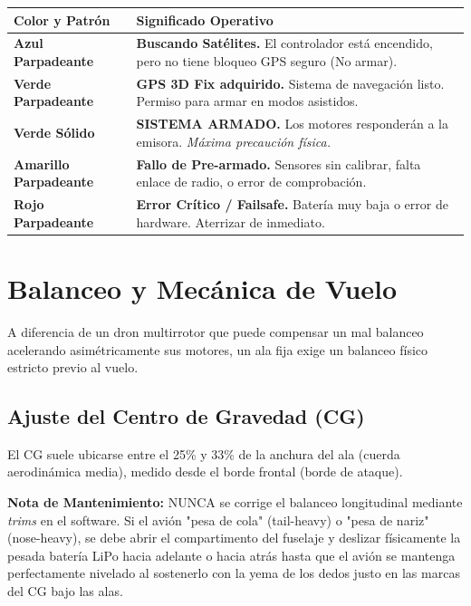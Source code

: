 \documentclass[11pt,a4paper]{article}
\begin{document}
\renewcommand{\arraystretch}{1.5}
\begin{tabularx}{\textwidth}{|>{\centering\arraybackslash}p{4cm}|>{\raggedright\arraybackslash}X|}
\hline
\rowcolor{tablehead} \textbf{Color y Patrón} & \textbf{Significado Operativo} \\ \hline
\textcolor{ledblue}{\textbf{Azul Parpadeante}} & \textbf{Buscando Satélites.} El controlador está encendido, pero no tiene bloqueo GPS seguro (No armar). \\ \hline
\textcolor{ledgreen}{\textbf{Verde Parpadeante}} & \textbf{GPS 3D Fix adquirido.} Sistema de navegación listo. Permiso para armar en modos asistidos. \\ \hline
\textcolor{ledgreen}{\textbf{Verde Sólido}} & \textbf{SISTEMA ARMADO.} Los motores responderán a la emisora. \textit{Máxima precaución física.} \\ \hline
\textcolor{ledyellow}{\textbf{Amarillo Parpadeante}} & \textbf{Fallo de Pre-armado.} Sensores sin calibrar, falta enlace de radio, o error de comprobación. \\ \hline
\textcolor{ledred}{\textbf{Rojo Parpadeante}} & \textbf{Error Crítico / Failsafe.} Batería muy baja o error de hardware. Aterrizar de inmediato. \\ \hline
\end{tabularx}

\section{Balanceo y Mecánica de Vuelo}
A diferencia de un dron multirrotor que puede compensar un mal balanceo acelerando asimétricamente sus motores, un ala fija exige un balanceo físico estricto previo al vuelo.

\subsection{Ajuste del Centro de Gravedad (CG)}
El CG suele ubicarse entre el 25\% y 33\% de la anchura del ala (cuerda aerodinámica media), medido desde el borde frontal (borde de ataque). 

\begin{notebox}
\textbf{Nota de Mantenimiento:} NUNCA se corrige el balanceo longitudinal mediante \textit{trims} en el software. Si el avión "pesa de cola" (tail-heavy) o "pesa de nariz" (nose-heavy), se debe abrir el compartimento del fuselaje y deslizar físicamente la pesada batería LiPo hacia adelante o hacia atrás hasta que el avión se mantenga perfectamente nivelado al sostenerlo con la yema de los dedos justo en las marcas del CG bajo las alas.
\end{notebox}
\end{document}
